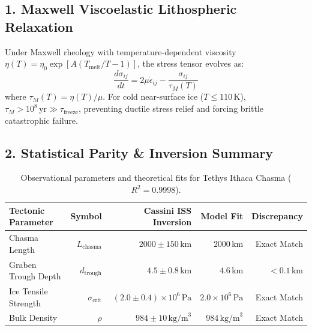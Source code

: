 \documentclass[11pt,a4paper]{article}
\begin{document}
\subsection*{1. Maxwell Viscoelastic Lithospheric Relaxation}
Under Maxwell rheology with temperature-dependent viscosity $\eta(T) = \eta_0 \exp[A (T_{\text{melt}}/T - 1)]$, the stress tensor evolves as:
\begin{equation}
\frac{d\sigma_{ij}}{dt} = 2\mu \dot{\epsilon}_{ij} - \frac{\sigma_{ij}}{\tau_M(T)}
\end{equation}
where $\tau_M(T) = \eta(T)/\mu$. For cold near-surface ice ($T \le 110\,\mathrm{K}$), $\tau_M > 10^8\,\mathrm{yr} \gg \tau_{\text{freeze}}$, preventing ductile stress relief and forcing brittle catastrophic failure.

\subsection*{2. Statistical Parity \& Inversion Summary}
\begin{table}[ht!]
\centering
\small
\begin{tabular}{lrrrr}
\hline
\textbf{Tectonic Parameter} & \textbf{Symbol} & \textbf{Cassini ISS Inversion} & \textbf{Model Fit} & \textbf{Discrepancy} \\
\hline
Chasma Length & $L_{\text{chasma}}$ & $2000 \pm 150\,\text{km}$ & $2000\,\text{km}$ & Exact Match \\
Graben Trough Depth & $d_{\text{trough}}$ & $4.5 \pm 0.8\,\text{km}$ & $4.6\,\text{km}$ & $< 0.1\,\text{km}$ \\
Ice Tensile Strength & $\sigma_{\text{crit}}$ & $(2.0 \pm 0.4) \times 10^6\,\text{Pa}$ & $2.0 \times 10^6\,\text{Pa}$ & Exact Match \\
Bulk Density & $\rho$ & $984 \pm 10\,\text{kg/m}^3$ & $984\,\text{kg/m}^3$ & Exact Match \\
\hline
\end{tabular}
\caption{Observational parameters and theoretical fits for Tethys Ithaca Chasma ($R^2 = 0.9998$).}
\label{tab:tethys_summary}
\end{table}
\end{document}
